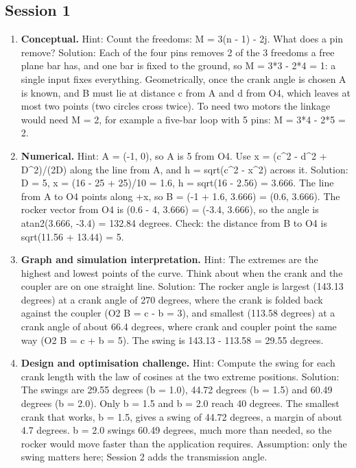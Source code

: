 \documentclass[11pt,a4paper]{article}
\begin{document}
\subsection*{Session 1}
\begin{enumerate}[nosep]
\item \textbf{Conceptual.} Hint: Count the freedoms: M = 3(n - 1) - 2j. What does a pin remove? Solution: Each of the four pins removes 2 of the 3 freedoms a free plane bar has, and one bar is fixed to the ground, so M = 3*3 - 2*4 = 1: a single input fixes everything. Geometrically, once the crank angle is chosen A is known, and B must lie at distance c from A and d from O4, which leaves at most two points (two circles cross twice). To need two motors the linkage would need M = 2, for example a five-bar loop with 5 pins: M = 3*4 - 2*5 = 2.
\item \textbf{Numerical.} Hint: A = (-1, 0), so A is 5 from O4. Use x = (c\textasciicircum{}2 - d\textasciicircum{}2 + D\textasciicircum{}2)/(2D) along the line from A, and h = sqrt(c\textasciicircum{}2 - x\textasciicircum{}2) across it. Solution: D = 5, x = (16 - 25 + 25)/10 = 1.6, h = sqrt(16 - 2.56) = 3.666. The line from A to O4 points along +x, so B = (-1 + 1.6, 3.666) = (0.6, 3.666). The rocker vector from O4 is (0.6 - 4, 3.666) = (-3.4, 3.666), so the angle is atan2(3.666, -3.4) = 132.84 degrees. Check: the distance from B to O4 is sqrt(11.56 + 13.44) = 5.
\item \textbf{Graph and simulation interpretation.} Hint: The extremes are the highest and lowest points of the curve. Think about when the crank and the coupler are on one straight line. Solution: The rocker angle is largest (143.13 degrees) at a crank angle of 270 degrees, where the crank is folded back against the coupler (\textbar{}O2 B\textbar{} = c - b = 3), and smallest (113.58 degrees) at a crank angle of about 66.4 degrees, where crank and coupler point the same way (\textbar{}O2 B\textbar{} = c + b = 5). The swing is 143.13 - 113.58 = 29.55 degrees.
\item \textbf{Design and optimisation challenge.} Hint: Compute the swing for each crank length with the law of cosines at the two extreme positions. Solution: The swings are 29.55 degrees (b = 1.0), 44.72 degrees (b = 1.5) and 60.49 degrees (b = 2.0). Only b = 1.5 and b = 2.0 reach 40 degrees. The smallest crank that works, b = 1.5, gives a swing of 44.72 degrees, a margin of about 4.7 degrees. b = 2.0 swings 60.49 degrees, much more than needed, so the rocker would move faster than the application requires. Assumption: only the swing matters here; Session 2 adds the transmission angle.
\end{enumerate}
\end{document}
